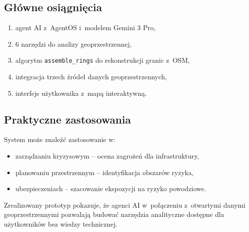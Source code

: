 \subsection*{Główne osiągnięcia}

\begin{enumerate}
    \item agent AI z~AgentOS i~modelem Gemini 3 Pro,
    \item 6 narzędzi do analizy geoprzestrzennej,
    \item algorytm \texttt{assemble\_rings} do rekonstrukcji granic z~OSM,
    \item integracja trzech źródeł danych geoprzestrzennych,
    \item interfejs użytkownika z~mapą interaktywną.
\end{enumerate}

\subsection*{Praktyczne zastosowania}

System może znaleźć zastosowanie w:

\begin{itemize}
    \item zarządzaniu kryzysowym -- ocena zagrożeń dla infrastruktury,
    \item planowaniu przestrzennym -- identyfikacja obszarów ryzyka,
    \item ubezpieczeniach -- szacowanie ekspozycji na ryzyko powodziowe.
\end{itemize}

\vspace{1cm}

Zrealizowany prototyp pokazuje, że agenci AI w~połączeniu z~otwartymi danymi geoprzestrzennymi pozwalają budować narzędzia analityczne dostępne dla użytkowników bez wiedzy technicznej.

